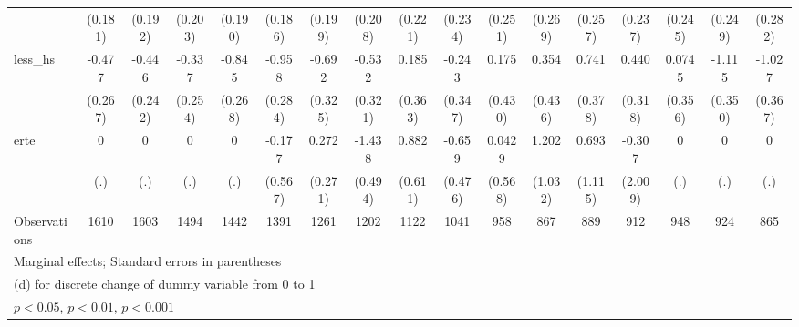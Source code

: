 {\begin{tabular}{l*{16}{c}}
                    &     (0.181)         &     (0.192)         &     (0.203)         &     (0.190)         &     (0.186)         &     (0.199)         &     (0.208)         &     (0.221)         &     (0.234)         &     (0.251)         &     (0.269)         &     (0.257)         &     (0.237)         &     (0.245)         &     (0.249)         &     (0.282)         \\
[1em]
less\_hs             &      -0.477         &      -0.446         &      -0.337         &      -0.845\sym{**} &      -0.958\sym{***}&      -0.692\sym{*}  &      -0.532         &       0.185         &      -0.243         &       0.175         &       0.354         &       0.741\sym{*}  &       0.440         &      0.0745         &      -1.115\sym{**} &      -1.027\sym{**} \\
                    &     (0.267)         &     (0.242)         &     (0.254)         &     (0.268)         &     (0.284)         &     (0.325)         &     (0.321)         &     (0.363)         &     (0.347)         &     (0.430)         &     (0.436)         &     (0.378)         &     (0.318)         &     (0.356)         &     (0.350)         &     (0.367)         \\
[1em]
erte                &           0         &           0         &           0         &           0         &      -0.177         &       0.272         &      -1.438\sym{**} &       0.882         &      -0.659         &      0.0429         &       1.202         &       0.693         &      -0.307         &           0         &           0         &           0         \\
                    &         (.)         &         (.)         &         (.)         &         (.)         &     (0.567)         &     (0.271)         &     (0.494)         &     (0.611)         &     (0.476)         &     (0.568)         &     (1.032)         &     (1.115)         &     (2.009)         &         (.)         &         (.)         &         (.)         \\
\hline
Observations        &        1610         &        1603         &        1494         &        1442         &        1391         &        1261         &        1202         &        1122         &        1041         &         958         &         867         &         889         &         912         &         948         &         924         &         865         \\
\hline\hline
\multicolumn{17}{l}{\footnotesize Marginal effects; Standard errors in parentheses}\\
\multicolumn{17}{l}{\footnotesize  (d) for discrete change of dummy variable from 0 to 1}\\
\multicolumn{17}{l}{\footnotesize \sym{*} \(p<0.05\), \sym{**} \(p<0.01\), \sym{***} \(p<0.001\)}\\
\end{tabular}
}
